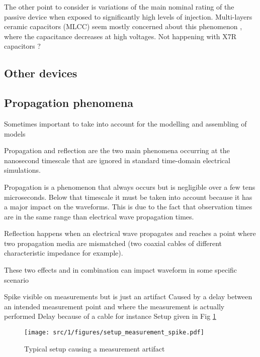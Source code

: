 The other point to consider is variations of the main nominal rating of the passive device when exposed to significantly high levels of injection. Multi-layers ceramic capacitors (MLCC) seem mostly concerned about this phenomenon \cite{capa-esd-cz}, where the capacitance decreases at high voltages.
Not happening with X7R capacitors ?

\subsection{Other devices}

\subsection{Propagation phenomena}

Sometimes important to take into account for the modelling and assembling of models

Propagation and reflection are the two main phenomena occurring at the nanosecond timescale that are ignored in standard time-domain electrical simulations.

Propagation is a phenomenon that always occurs but is negligible over a few tens microseconds.
Below that timescale it must be taken into account because it has a major impact on the waveforms.
This is due to the fact that observation times are in the same range than electrical wave propagation times.

Reflection happens when an electrical wave propagates and reaches a point where two propagation media are mismatched (two coaxial cables of different characteristic impedance for example).

These two effects and in combination can impact waveform in some specific scenario

Spike visible on measurements but is just an artifact
Caused by a delay between an intended measurement point and where the measurement is actually performed
Delay because of a cable for instance
Setup given in Fig \ref{fig:setup-measurement-spike}

\begin{figure}[!h]
  \centering
  \texttt{[image: src/1/figures/setup\_measurement\_spike.pdf]}
  \caption{Typical setup causing a measurement artifact}
  \label{fig:setup-measurement-spike}
\end{figure}

